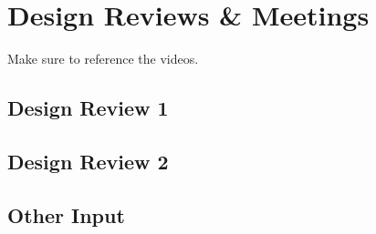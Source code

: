 \chapter{Design Reviews \& Meetings}
Make sure to reference the videos.

\section{Design Review 1}

\section{Design Review 2}

\section{Other Input}

